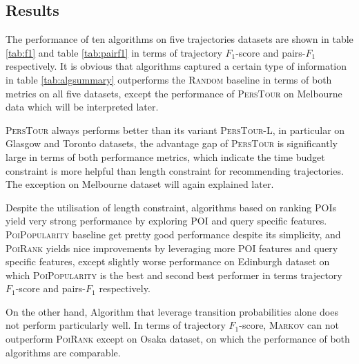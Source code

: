 \subsection{Results}
\label{sec:result}


The performance of ten algorithms on five trajectories datasets are shown in table \ref{tab:f1}
and table \ref{tab:pairf1} in terms of trajectory $F_1$-score and pairs-$F_1$ respectively.
%
It is obvious that algorithms captured a certain type of information in table \ref{tab:algsummary}
outperforms the \textsc{Random} baseline in terms of both metrics on all five datasets,
except the performance of \textsc{PersTour}\cite{ijcai15} on Melbourne data which will be interpreted later.

\textsc{PersTour}\cite{ijcai15} always performs better than its variant \textsc{PersTour-L},
in particular on Glasgow and Toronto datasets, the advantage gap of \textsc{PersTour}
is significantly large in terms of both performance metrics,
%
which indicate the time budget constraint is more helpful than length constraint for recommending trajectories.
The exception on Melbourne dataset will again explained later.

Despite the utilisation of length constraint, algorithms based on ranking POIs yield very strong performance
by exploring POI and query specific features.
%
\textsc{PoiPopularity} baseline get pretty good performance despite its simplicity,
and \textsc{PoiRank} yields nice improvements by leveraging more POI features and query specific features,
except slightly worse performance on Edinburgh dataset on which \textsc{PoiPopularity} is the best and
second best performer in terms trajectory $F_1$-score and pairs-$F_1$ respectively.

On the other hand, Algorithm that leverage transition probabilities alone does not perform particularly well.
%
In terms of trajectory $F_1$-score,
\textsc{Markov} can not outperform \textsc{PoiRank} except on Osaka dataset,
on which the performance of both algorithms are comparable.

